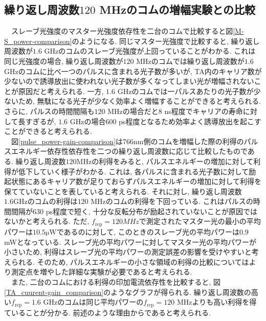\documentclass[uplatex, dvipdfmx, a4paper, report, papersize, 11pt]{jsbook}
\begin{document}
\newpage
\subsection{繰り返し周波数$120$ MHzのコムの増幅実験との比較}
　スレーブ光強度のマスター光強度依存性を二台のコムで比較すると図\ref{M-S_power-comparison}のようになる. 同じマスター光強度で比較すると, 繰り返し周波数が$1.6$ GHzのコムのスレーブ光強度が上回っていることがわかる. これは同じ光強度の場合, 繰り返し周波数が$120$ MHzのコムでは繰り返し周波数が$1.6$ GHzのコムに比べ一つのパルスに含まれる光子数が多いが, TA内のキャリア数が少ないので誘導放出に使われない光子数が多くなってしまい光が増幅されないことが原因だと考えられる. 一方, $1.6$ GHzのコムでは一パルスあたりの光子数が少ないため, 無駄になる光子が少なく効率よく増幅することができると考えられる. さらに, パルスの時間間隔も$120$ MHzの場合だと$8$ ns程度でキャリアの寿命に対して長すぎるが, $1.6$ GHzの場合$600$ ps程度となるため効率よく誘導放出を起こすことができると考えられる. \\
　図\ref{pulse_power-gain-comparison}は766nm側のコムを増幅した際の利得のパルスエネルギー依存性依存性を二つの繰り返し周波数に応じて比較したものである. 繰り返し周波数$120 \mathrm{MHz}$の利得をみると, パルスエネルギーの増加に対して利得が低下していく様子がわかる. これは, 各パルスに含まれる光子数に対して励起状態にあるキャリア数が足りておらずパルスエネルギーの増加に対して利得を保てていないことを表していると考えられる. それに対し, 繰り返し周波数$1.6 \mathrm{GHz}$のコムの利得は$120$ MHzのコムの利得を下回っている. これはパルスの時間間隔が$630$ ps程度で短く, 十分な反転分布が励起されていないことが原因ではないかと考えられる. ただ, $f_\mathrm{rep} = 120MHz$で測定されたマスター光の最小の平均パワーは$10.5 \mathrm{\mu W}$であるのに対して, このときのスレーブ光の平均パワーは$0.9$ mWとなっている. スレーブ光の平均パワーに対してマスター光の平均パワーが小さいため, 利得はスレーブ光の平均パワーの測定誤差の影響を受けやすいと考えられる. そのため, パルスエネルギーの小さな領域の利得の比較についてはより測定点を増やした詳細な実験が必要であると考えられる. \\
　また, 二台のコムにおける利得の印加電流依存性を比較すると, 図\ref{TA_cuurent-gain_comparison}のようなグラフが得られる. 繰り返し周波数の高い$f_\mathrm{rep} = 1.6$ GHzのコムは同じ平均パワーの$f_\mathrm{rep} = 120$ MHzよりも高い利得を得ていることが分かる. 前述のような理由からであると考えられる.
\end{document}
